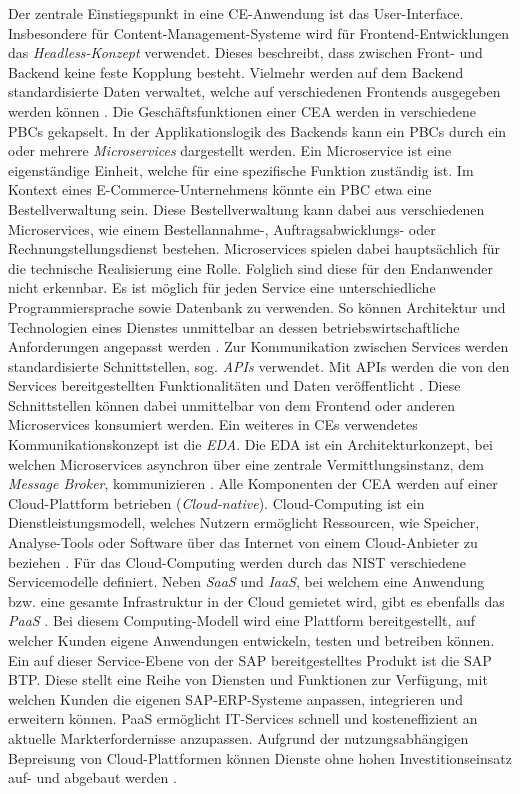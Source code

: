 Der zentrale Einstiegspunkt in eine CE-Anwendung ist das User-Interface. Insbesondere für Content-Management-Systeme wird für Frontend-Entwicklungen das \textit{Headless-Konzept} verwendet. Dieses beschreibt, dass zwischen Front- und Backend keine feste Kopplung besteht. Vielmehr werden auf dem Backend standardisierte Daten verwaltet, welche auf verschiedenen Frontends ausgegeben werden können \cite{.20230313}. Die Geschäftsfunktionen einer CEA werden in verschiedene PBCs gekapselt. In der Applikationslogik des Backends kann ein PBCs durch ein oder mehrere \textit{Microservices} dargestellt werden. Ein Microservice ist eine eigenständige Einheit, welche für eine spezifische Funktion zuständig ist. Im Kontext eines E-Commerce-Unternehmens könnte ein PBC etwa eine Bestellverwaltung sein. Diese Bestellverwaltung kann dabei aus verschiedenen Microservices, wie einem Bestellannahme-, Auftragsabwicklungs- oder Rechnungstellungsdienst bestehen. Microservices spielen dabei hauptsächlich für die technische Realisierung eine Rolle. Folglich sind diese für den Endanwender nicht erkennbar. Es ist möglich für jeden Service eine unterschiedliche Programmiersprache sowie Datenbank zu verwenden. So können Architektur und Technologien eines Dienstes unmittelbar an dessen betriebswirtschaftliche Anforderungen angepasst werden \cite[41]{.2009}. Zur Kommunikation zwischen Services werden standardisierte Schnittstellen, sog. \textit{\ac*{APIs}} verwendet. Mit APIs werden die von den Services bereitgestellten Funktionalitäten und Daten veröffentlicht \cite[15]{Biehl.2015}. Diese Schnittstellen können dabei unmittelbar von dem Frontend oder anderen Microservices konsumiert werden. Ein weiteres in CEs verwendetes Kommunikationskonzept ist die \textit{\ac{EDA}}. Die EDA ist ein Architekturkonzept, bei welchen Microservices asynchron über eine zentrale Vermittlungsinstanz, dem \textit{Message Broker}, kommunizieren \cite[54]{Bruns.2010}. Alle Komponenten der CEA werden auf einer Cloud-Plattform betrieben (\textit{Cloud-native}). Cloud-Computing ist ein Dienstleistungsmodell, welches Nutzern ermöglicht Ressourcen, wie Speicher, Analyse-Tools oder Software über das Internet von einem Cloud-Anbieter zu beziehen \cite[5]{Reinheimer.2018}. Für das Cloud-Computing werden durch das \ac{NIST} verschiedene Servicemodelle definiert. Neben \textit{\ac{SaaS}} und \textit{\ac{IaaS}}, bei welchem  eine Anwendung bzw. eine gesamte Infrastruktur in der Cloud gemietet wird, gibt es ebenfalls das \textit{\ac{PaaS}} \cite{Reinheimer.2018} \cite[9]{Reinheimer.2018}. Bei diesem Computing-Modell wird eine Plattform bereitgestellt, auf welcher Kunden eigene Anwendungen entwickeln, testen und betreiben können. Ein auf dieser Service-Ebene von der SAP bereitgestelltes Produkt ist die \ac{SAP BTP}. Diese stellt eine Reihe von Diensten und Funktionen zur Verfügung, mit welchen Kunden die eigenen SAP-ERP-Systeme anpassen, integrieren und erweitern können. PaaS ermöglicht IT-Services schnell und kosteneffizient an aktuelle Markterfordernisse anzupassen. Aufgrund der nutzungsabhängigen Bepreisung von Cloud-Plattformen können Dienste ohne hohen Investitionseinsatz auf- und abgebaut werden \cite[10]{Reinheimer.2018}. 

